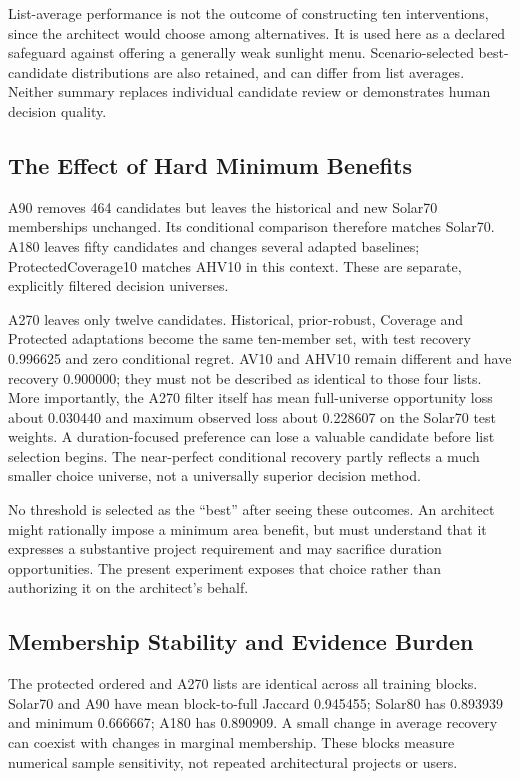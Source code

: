 \documentclass{llncs}
\begin{document}
List-average performance is not the outcome of constructing ten interventions, since the architect would choose among alternatives. It is used here as a declared safeguard against offering a generally weak sunlight menu. Scenario-selected best-candidate distributions are also retained, and can differ from list averages. Neither summary replaces individual candidate review or demonstrates human decision quality.

\subsection{The Effect of Hard Minimum Benefits}
A90 removes 464 candidates but leaves the historical and new Solar70 memberships unchanged. Its conditional comparison therefore matches Solar70. A180 leaves fifty candidates and changes several adapted baselines; ProtectedCoverage10 matches AHV10 in this context. These are separate, explicitly filtered decision universes.

A270 leaves only twelve candidates. Historical, prior-robust, Coverage and Protected adaptations become the same ten-member set, with test recovery 0.996625 and zero conditional regret. AV10 and AHV10 remain different and have recovery 0.900000; they must not be described as identical to those four lists. More importantly, the A270 filter itself has mean full-universe opportunity loss about 0.030440 and maximum observed loss about 0.228607 on the Solar70 test weights. A duration-focused preference can lose a valuable candidate before list selection begins. The near-perfect conditional recovery partly reflects a much smaller choice universe, not a universally superior decision method.

No threshold is selected as the ``best'' after seeing these outcomes. An architect might rationally impose a minimum area benefit, but must understand that it expresses a substantive project requirement and may sacrifice duration opportunities. The present experiment exposes that choice rather than authorizing it on the architect's behalf.

\subsection{Membership Stability and Evidence Burden}

The protected ordered and A270 lists are identical across all training blocks. Solar70 and A90 have mean block-to-full Jaccard 0.945455; Solar80 has 0.893939 and minimum 0.666667; A180 has 0.890909. A small change in average recovery can coexist with changes in marginal membership. These blocks measure numerical sample sensitivity, not repeated architectural projects or users.
\end{document}
